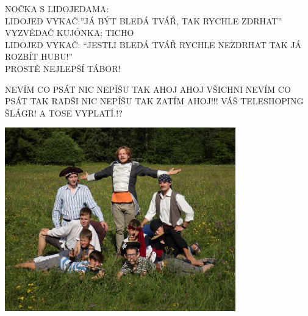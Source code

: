 \begin{multicols}{2}
NOČKA S LIDOJEDAMA:\\
LIDOJED VYKAČ:”JÁ BÝT BLEDÁ TVÁŘ, TAK RYCHLE ZDRHAT”\\
VYZVĚDAČ KUJÓNKA: TICHO\\
LIDOJED VYKAČ: “JESTLI BLEDÁ TVÁŘ RYCHLE NEZDRHAT TAK JÁ ROZBÍT HUBU!”\\
PROSTĚ NEJLEPŠÍ TÁBOR!\\


NEVÍM CO PSÁT NIC NEPÍŠU TAK AHOJ
AHOJ VŠICHNI NEVÍM CO PSÁT TAK RADŠI NIC NEPÍŠU TAK ZATÍM AHOJ!!! VÁŠ TELESHOPING ŠLÁGR! A TOSE VYPLATÍ.!?

\end{multicols}

\begin{center}

\includegraphics[width=10cm]{img/druziny/urzoni.JPG}

\end{center}

\clearpage

